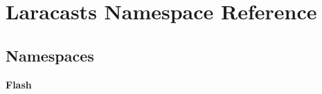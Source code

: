 \section{Laracasts Namespace Reference}
\label{namespace_laracasts}
\subsection*{Namespaces}
\begin{DoxyCompactItemize}
\item 
 {\bf Flash}
\end{DoxyCompactItemize}
